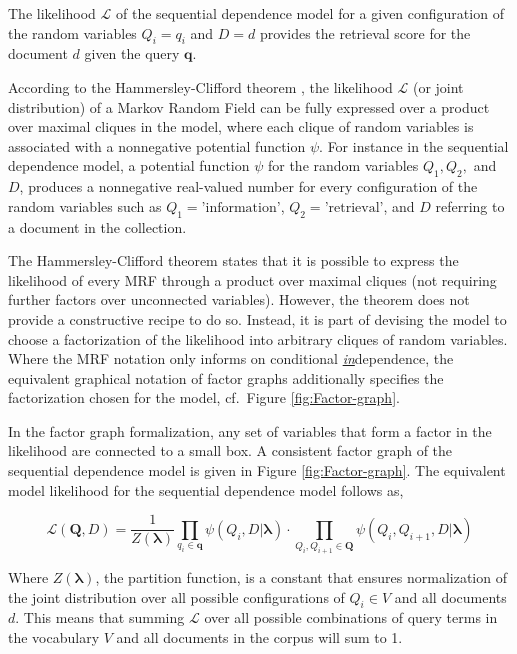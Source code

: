 \documentclass[]{article}
\begin{document}
The likelihood $\mathcal{L}$ of the sequential dependence model for
a given configuration of the random variables $Q_{i}=q_{i}$ and $D=d$
provides the retrieval score for the document $d$ given the query
$\mathbf{q}$.

According to the Hammersley-Clifford theorem \cite{murphy2012book},
the likelihood $\mathcal{L}$ (or joint distribution) of a Markov
Random Field can be fully expressed over a product over maximal cliques
in the model, where each clique of random variables is associated
with a nonnegative potential function $\psi$. For instance in the
sequential dependence model, a potential function $\psi$ for the
random variables $Q_{1},Q_{2},$ and $D$, produces a nonnegative
real-valued number for every configuration of the random variables
such as $Q_{1}=\mbox{'information'}$, $Q_{2}=\mbox{'retrieval'}$,
and $D$ referring to a document in the collection.

The Hammersley-Clifford theorem states that it is possible to express
the likelihood of every MRF through a product over maximal cliques
(not requiring further factors over unconnected variables). However,
the theorem does not provide a constructive recipe to do so. Instead,
it is part of devising the model to choose a factorization of the
likelihood into arbitrary cliques of random variables. Where the MRF
notation only informs on conditional \uline{\emph{in}}dependence, the equivalent
graphical notation of factor graphs additionally specifies the factorization
chosen for the model, cf.\ Figure \ref{fig:Factor-graph}. 

In the factor graph formalization, any set of variables that form
a factor in the likelihood are connected to a small box. A consistent
factor graph of the sequential dependence model is given in Figure
\ref{fig:Factor-graph}. The equivalent model likelihood for the sequential
dependence model follows as,

\[
\mathcal{L}(\mathbf{Q},D)=\frac{1}{Z(\boldsymbol{\lambda})}\prod_{q_{i}\in\mathbf{q}}\psi(Q_{i},D|\boldsymbol{\lambda})\cdot\prod_{Q_{i},Q_{i+1}\in\mathbf{Q}}\psi(Q_{i},Q_{i+1},D|\boldsymbol{\lambda})
\]

\noindent Where $Z(\boldsymbol{\lambda})$, the partition
function, is a constant that ensures normalization
of the joint distribution over all possible configurations of $Q_{i}\in V$
and all documents $d$. This means that summing $\mathcal{L}$ over
all possible combinations of query terms in the vocabulary $V$ and
all documents in the corpus will sum to 1. 
\end{document}

